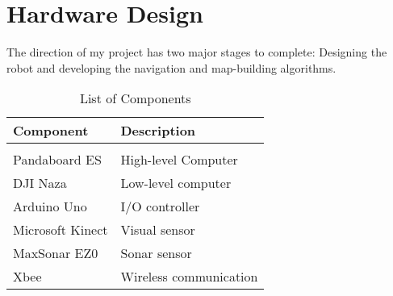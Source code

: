 \documentclass[letterpaper, oneside, 12pt]{report}
\begin{document}
\chapter{Hardware Design}

The direction of my project has two major stages to complete: Designing the robot and developing the navigation and map-building algorithms. \\


\begin{table}[h!]
\centering
\caption{List of Components}
\vspace{2mm}
\begin{tabular}{l l}
\hline \hline
\vspace{-2mm}
Component & \multicolumn{1}{l}{Description} \\ [1ex]
\hline
& \\
Pandaboard ES & High-level Computer \\
DJI Naza & Low-level computer \\
Arduino Uno & I/O controller \\
Microsoft Kinect & Visual sensor \\
MaxSonar EZ0	& Sonar sensor \\
Xbee & Wireless communication
\end{tabular}
\end{table}

\clearpage



\end{document}
